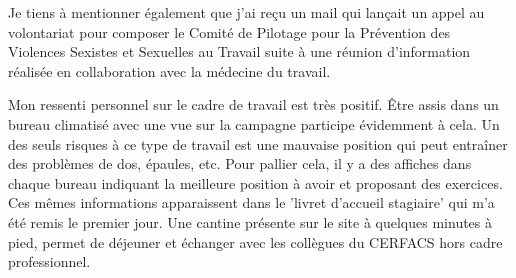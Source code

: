     Je tiens à mentionner également que j'ai reçu un mail qui lançait un appel au volontariat pour composer le Comité de Pilotage pour la Prévention des Violences Sexistes et Sexuelles au Travail suite à une réunion d'information réalisée en collaboration avec la médecine du travail.


Mon ressenti personnel sur le cadre de travail est très positif. Être assis dans un bureau climatisé avec une vue sur la campagne participe évidemment à cela. Un des seuls risques à ce type de travail est une mauvaise position qui peut entraîner des problèmes de dos, épaules, etc. Pour pallier cela, il y a des affiches dans chaque bureau indiquant la meilleure position à avoir et proposant des exercices. Ces mêmes informations apparaissent dans le 'livret d'accueil stagiaire' qui m'a été remis le premier jour.
Une cantine présente sur le site à quelques minutes à pied, permet de déjeuner et échanger avec les collègues du CERFACS hors cadre professionnel.